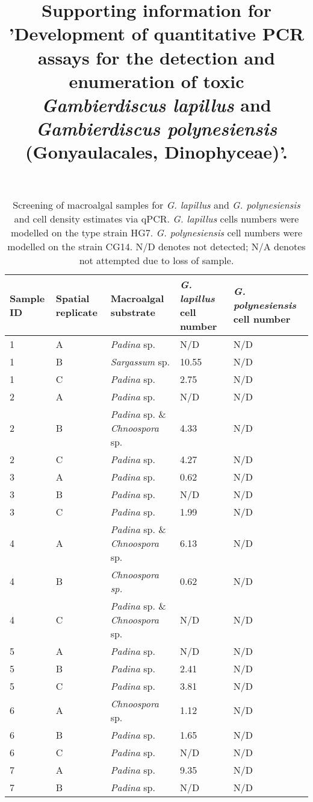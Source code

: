 \documentclass[12pt]{article}
\title{Supporting information for 'Development of quantitative PCR assays for the detection and enumeration of toxic \emph{Gambierdiscus lapillus} and \emph{Gambierdiscus polynesiensis} (Gonyaulacales, Dinophyceae)'.}
\date{}
\begin{document}
\maketitle
\FloatBarrier
\begin{longtable}{ | p{2cm} | p{2cm} | p{3cm} | p{3.5cm} | p{3.5cm} | }
\caption{Screening of macroalgal samples for \emph{G. lapillus} and \emph{G. polynesiensis} and cell density estimates via qPCR. \emph{G. lapillus} cells numbers were modelled on the type strain HG7. \emph{G. polynesiensis} cell numbers were modelled on the strain CG14. N/D denotes not detected; N/A denotes not attempted due to loss of sample.}\\
\hline
\label{tbl:MacroalgaeTable}
\textbf{Sample ID}&\textbf{Spatial replicate}&\textbf{Macroalgal substrate}&\textbf{\textit{G. lapillus} cell number}&\textbf{\textit{G. polynesiensis} cell number}\\
\hline
1&A&\emph{Padina} sp.&N/D&N/D\\
\hline
1&B&\emph{Sargassum} sp.&10.55
&N/D\\
\hline
1&C&\emph{Padina} sp.&2.75
&N/D\\
\hline
2&A&\emph{Padina} sp.&N/D&N/D\\
\hline
2&B&\emph{Padina} sp. \& \emph{Chnoospora} sp.&4.33&N/D\\
\hline
2&C&\emph{Padina} sp.&4.27&N/D\\
\hline
3&A&\emph{Padina} sp.&0.62
&N/D\\
\hline
3&B&\emph{Padina} sp.&N/D&N/D\\
\hline
3&C&\emph{Padina} sp.&1.99
&N/D\\
\hline
4&A&\emph{Padina} sp. \& \emph{Chnoospora} sp.&6.13
&N/D\\
\hline
4&B&\emph{Chnoospora sp.}&0.62
&N/D\\
\hline
4&C&\emph{Padina} sp. \& \emph{Chnoospora} sp.&N/D&N/D\\
\hline
5&A&\emph{Padina} sp.&N/D&N/D\\
\hline
5&B&\emph{Padina} sp.&2.41
&N/D\\
\hline
5&C&\emph{Padina} sp.&3.81
&N/D\\
\hline
6&A&\emph{Chnoospora} sp.&1.12
&N/D\\
\hline
6&B&\emph{Padina} sp.&1.65
&N/D\\
\hline
6&C&\emph{Padina} sp.&N/D&N/D\\
\hline
7
&A&\emph{Padina} sp.&9.35&N/D\\
\hline
7
&B&\emph{Padina} sp.&N/D&N/D\\

\end{longtable}
\end{document}
